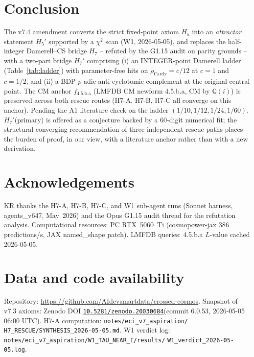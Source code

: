 \documentclass[a4paper,11pt]{article}
\newcommand{\fLM}{f_{\text{4.5.b.a}}}
\newcommand{\Qi}{\mathbb{Q}(i)}
\newcommand{\Zeno}{\href{https://doi.org/10.5281/zenodo.20030684}{\texttt{10.5281/zenodo.20030684}}}
\theoremstyle{definition}
\theoremstyle{remark}
\begin{document}
\section{Conclusion}
\label{sec:conclusion}

The v7.4 amendment converts the strict fixed-point axiom $H_5$ into an
\emph{attractor} statement $H_5'$ supported by a $\chi^{2}$ scan
(W1, 2026-05-05), and replaces the half-integer Damerell--CS bridge
$H_7$ -- refuted by the G1.15 audit on parity grounds -- with a
two-part bridge $H_7'$ comprising (i) an INTEGER-point Damerell
ladder (Table~\ref{tab:ladder}) with parameter-free hits on
$\rho_{\mathrm{Cardy}}=c/12$ at $c=1$ and $c=1/2$, and (ii) a BDP
$p$-adic anti-cyclotomic complement at the original central point.
The CM anchor $\fLM$ (LMFDB CM newform 4.5.b.a, CM by $\Qi$) is
preserved across both rescue routes (H7-A, H7-B, H7-C all converge on
this anchor).  Pending the A1 literature check on the ladder
$(1/10,1/12,1/24,1/60)$, $H_7'$(primary) is offered as a conjecture
backed by a 60-digit numerical fit; the structural converging
recommendation of three independent rescue paths places the burden of
proof, in our view, with a literature anchor rather than with a new
derivation.

\section*{Acknowledgements}

KR thanks the H7-A, H7-B, H7-C, and W1 sub-agent runs (Sonnet harness,
agents\_v647, May~2026) and the Opus G1.15 audit thread for the
refutation analysis.  Computational resources: PC RTX~5060~Ti
(cosmopower-jax 386 predictions/s, JAX named\_shape patch).
LMFDB queries: 4.5.b.a $L$-value cached 2026-05-05.

\section*{Data and code availability}

Repository: \url{https://github.com/AIdevsmartdata/crossed-cosmos}.
Snapshot of v7.3 axioms: Zenodo DOI \Zeno (commit 6.0.53, 2026-05-05
06:00 UTC).  H7-A computation: \texttt{notes/eci\_v7\_aspiration/}
\texttt{H7\_RESCUE/SYNTHESIS\_2026-05-05.md}.  W1 verdict log:
\texttt{notes/eci\_v7\_aspiration/W1\_TAU\_NEAR\_I/results/}
\texttt{W1\_verdict\_2026-05-05.log}.
\end{document}
